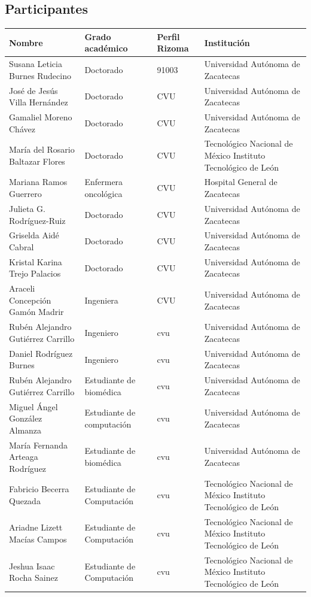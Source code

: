 \documentclass[12pt,a4paper]{article}
\begin{document}
\subsection{Participantes}
\begin{longtable}{p{6cm} p{3cm} p{2cm} p{5cm}}
\toprule
\textbf{Nombre} & \textbf{Grado académico} & \textbf{Perfil Rizoma} & \textbf{Institución} \\
\midrule
Susana Leticia Burnes Rudecino & Doctorado & 91003 & Universidad Autónoma de Zacatecas \\
José de Jesús Villa Hernández & Doctorado & CVU  & Universidad Autónoma de Zacatecas \\
Gamaliel Moreno Chávez & Doctorado & CVU  & Universidad Autónoma de Zacatecas \\
María del Rosario Baltazar Flores & Doctorado & CVU  & Tecnológico Nacional de México Instituto Tecnológico de León \\
Mariana Ramos Guerrero & Enfermera oncológica  & CVU  & Hospital General de Zacatecas \\
Julieta G. Rodríguez-Ruiz & Doctorado & CVU  & Universidad Autónoma de Zacatecas \\
Griselda Aidé Cabral & Doctorado & CVU  & Universidad Autónoma de Zacatecas\\
Kristal Karina Trejo Palacios & Doctorado & CVU  & Universidad Autónoma de Zacatecas\\
Araceli Concepción Gamón Madrir & Ingeniera & CVU  & Universidad Autónoma de Zacatecas\\
Rubén Alejandro Gutiérrez Carrillo & Ingeniero & cvu & Universidad Autónoma de Zacatecas \\
Daniel Rodríguez Burnes & Ingeniero & cvu & Universidad Autónoma de Zacatecas \\
Rubén Alejandro Gutiérrez Carrillo & Estudiante de biomédica & cvu & Universidad Autónoma de Zacatecas \\
Miguel Ángel González Almanza & Estudiante de computación & cvu & Universidad Autónoma de Zacatecas \\
María Fernanda Arteaga Rodríguez & Estudiante de biomédica & cvu & Universidad Autónoma de Zacatecas \\
Fabricio Becerra Quezada & Estudiante de Computación & cvu & Tecnológico Nacional de México Instituto Tecnológico de León \\
Ariadne Lizett Macías Campos & Estudiante de Computación & cvu & Tecnológico Nacional de México Instituto Tecnológico de León \\
Jeshua Isaac Rocha Sainez & Estudiante de Computación & cvu & Tecnológico Nacional de México Instituto Tecnológico de León \\

\bottomrule
\end{longtable}
\end{document}
